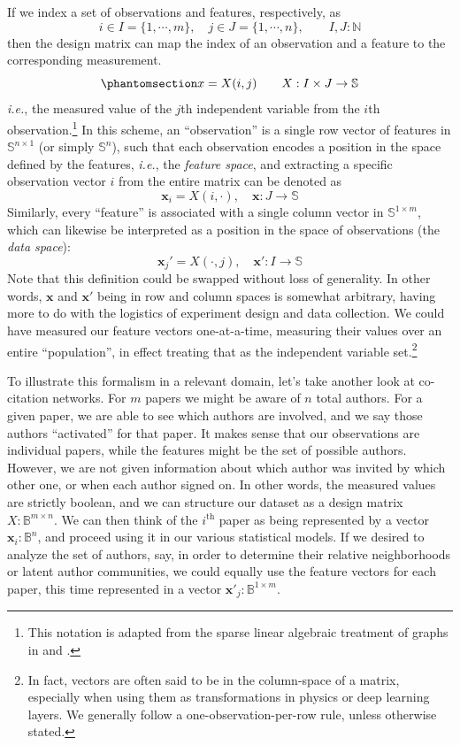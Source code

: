\documentclass[%
	12pt,
		oneside,
		letterpaper
]{book}
\begin{document}
If we index a set of observations and features, respectively, as
\[ i\in I=\{1,\cdots,m\}, \quad j\in J=\{1,\cdots,n\},\qquad I,J:\mathbb{N}\]
then the design matrix can map the index of an observation and a feature
to the corresponding measurement.
\begin{equation}\phantomsection\label{eq-design-mat}{
x=X(i,j)\qquad X : I\times J \rightarrow \mathbb{S}
}\end{equation} \emph{i.e.}, the measured value of the \(j\)th
independent variable from the \(i\)th observation.\footnote{ This
  notation is adapted from the sparse linear algebraic treatment of
  graphs in \textcite{GraphAlgorithmsLanguage_Kepner2011} and
  \textcite{MathematicalfoundationsGraphBLAS_Kepner2016}.} In this
scheme, an ``observation'' is a single row vector of features in
\(\mathbb{S}^{n\times 1}\) (or simply \(\mathbb{S}^{n}\)), such that
each observation encodes a position in the space defined by the
features, \emph{i.e.}, the \emph{feature space}, and extracting a
specific observation vector \(i\) from the entire matrix can be denoted
as \[\mathbf{x}_i=X(i,\cdot),\quad \mathbf{x}:J\rightarrow\mathbb{S}\]
Similarly, every ``feature'' is associated with a single column vector
in \(\mathbb{S}^{1\times m}\), which can likewise be interpreted as a
position in the space of observations (the \emph{data space}):
\[\mathbf{x}_j'=X(\cdot,j),\quad \mathbf{x}':I\rightarrow\mathbb{S}\]
Note that this definition could be swapped without loss of generality.
In other words, \(\mathbf{x}\) and \(\mathbf{x}'\) being in row and
column spaces is somewhat arbitrary, having more to do with the
logistics of experiment design and data collection. We could have
measured our feature vectors one-at-a-time, measuring their values over
an entire ``population'', in effect treating that as the independent
variable set.\footnote{ In fact, vectors are often said to be in the
  column-space of a matrix, especially when using them as
  transformations in physics or deep learning layers. We generally
  follow a one-observation-per-row rule, unless otherwise stated.}

To illustrate this formalism in a relevant domain, let's take another
look at co-citation networks. For \(m\) papers we might be aware of
\(n\) total authors. For a given paper, we are able to see which authors
are involved, and we say those authors ``activated'' for that paper. It
makes sense that our observations are individual papers, while the
features might be the set of possible authors. However, we are not given
information about which author was invited by which other one, or when
each author signed on. In other words, the measured values are strictly
boolean, and we can structure our dataset as a design matrix
\(X:\mathbb{B}^{m\times n}\). We can then think of the
\(i^{\mathrm{th}}\) paper as being represented by a vector
\(\mathbf{x}_i:\mathbb{B}^n\), and proceed using it in our various
statistical models. If we desired to analyze the set of authors, say, in
order to determine their relative neighborhoods or latent author
communities, we could equally use the feature vectors for each paper,
this time represented in a vector
\(\mathbf{x}'_j:\mathbb{B}^{1\times m}\).
\end{document}
